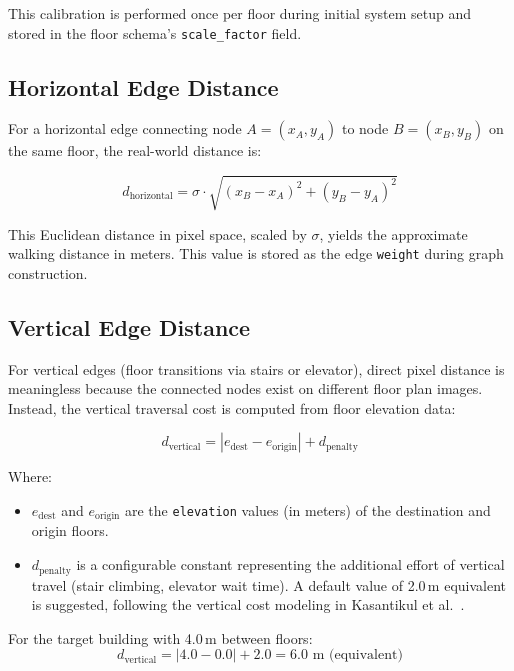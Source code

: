 This calibration is performed once per floor during initial system setup and stored in the floor schema's \texttt{scale\_factor} field.

\subsection{Horizontal Edge Distance}

For a horizontal edge connecting node $A = (x_A, y_A)$ to node $B = (x_B, y_B)$ on the same floor, the real-world distance is:

\begin{equation}
d_{\text{horizontal}} = \sigma \cdot \sqrt{(x_B - x_A)^2 + (y_B - y_A)^2}
\label{eq:horizontal-distance}
\end{equation}

This Euclidean distance in pixel space, scaled by $\sigma$, yields the approximate walking distance in meters. This value is stored as the edge \texttt{weight} during graph construction.

\subsection{Vertical Edge Distance}

For vertical edges (floor transitions via stairs or elevator), direct pixel distance is meaningless because the connected nodes exist on different floor plan images. Instead, the vertical traversal cost is computed from floor elevation data:

\begin{equation}
d_{\text{vertical}} = |e_{\text{dest}} - e_{\text{origin}}| + d_{\text{penalty}}
\label{eq:vertical-distance}
\end{equation}

Where:
\begin{itemize}
  \item $e_{\text{dest}}$ and $e_{\text{origin}}$ are the \texttt{elevation} values (in meters) of the destination and origin floors.
  \item $d_{\text{penalty}}$ is a configurable constant representing the additional effort of vertical travel (stair climbing, elevator wait time). A default value of 2.0\,m equivalent is suggested, following the vertical cost modeling in Kasantikul et al.\ \cite{Kasantikul2015}.
\end{itemize}

For the target building with 4.0\,m between floors:
\[
d_{\text{vertical}} = |4.0 - 0.0| + 2.0 = 6.0 \text{ m (equivalent)}
\]

